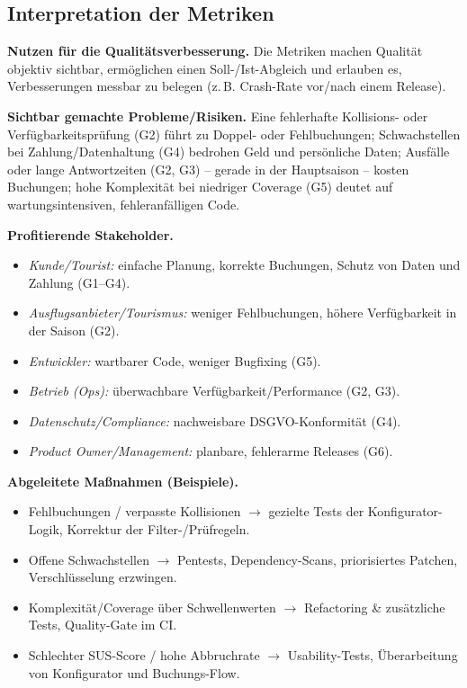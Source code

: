 \documentclass[
	fontsize=12pt,          %
	paper=a4,               %
	numbers=noenddot,       %
	listof=totoc,           %
	listof=entryprefix,     %
	listof=nochaptergap,    %
	bibliography=totoc,     %
	parskip=half,           %
	openany                 %
]{scrbook}
\begin{document}
\subsection*{Interpretation der Metriken}

\textbf{Nutzen für die Qualitätsverbesserung.}
Die Metriken machen Qualität objektiv sichtbar, ermöglichen einen Soll-/Ist-Abgleich
und erlauben es, Verbesserungen messbar zu belegen (z.\,B. Crash-Rate vor/nach
einem Release).

\textbf{Sichtbar gemachte Probleme/Risiken.}
Eine fehlerhafte Kollisions- oder Verfügbarkeitsprüfung (G2) führt zu Doppel-
oder Fehlbuchungen; Schwachstellen bei Zahlung/Datenhaltung (G4) bedrohen Geld
und persönliche Daten; Ausfälle oder lange Antwortzeiten (G2, G3) -- gerade in
der Hauptsaison -- kosten Buchungen; hohe Komplexität bei niedriger Coverage
(G5) deutet auf wartungsintensiven, fehleranfälligen Code.

\textbf{Profitierende Stakeholder.}
\begin{itemize}
	\item \emph{Kunde/Tourist:} einfache Planung, korrekte Buchungen, Schutz von
	      Daten und Zahlung (G1--G4).
	\item \emph{Ausflugsanbieter/Tourismus:} weniger Fehlbuchungen, höhere
	      Verfügbarkeit in der Saison (G2).
	\item \emph{Entwickler:} wartbarer Code, weniger Bugfixing (G5).
	\item \emph{Betrieb (Ops):} überwachbare Verfügbarkeit/Performance (G2, G3).
	\item \emph{Datenschutz/Compliance:} nachweisbare DSGVO-Konformität (G4).
	\item \emph{Product Owner/Management:} planbare, fehlerarme Releases (G6).
\end{itemize}

\textbf{Abgeleitete Maßnahmen (Beispiele).}
\begin{itemize}
	\item Fehlbuchungen / verpasste Kollisionen $\rightarrow$ gezielte Tests der
	      Konfigurator-Logik, Korrektur der Filter-/Prüfregeln.
	\item Offene Schwachstellen $\rightarrow$ Pentests, Dependency-Scans,
	      priorisiertes Patchen, Verschlüsselung erzwingen.
	\item Komplexität/Coverage über Schwellenwerten $\rightarrow$ Refactoring \&
	      zusätzliche Tests, Quality-Gate im CI.
	\item Schlechter SUS-Score / hohe Abbruchrate $\rightarrow$ Usability-Tests,
	      Überarbeitung von Konfigurator und Buchungs-Flow.
\end{itemize}
\end{document}
